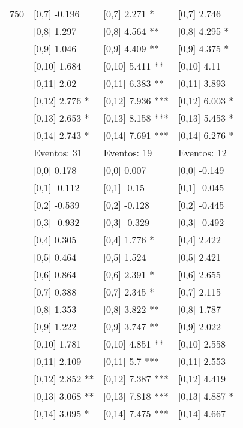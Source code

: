 \begin{table}
\begin{tabular}[t]{llll}
750 & {}[0,7] -0.196 & {}[0,7] 2.271 * & {}[0,7] 2.746\\
\addlinespace
 & {}[0,8] 1.297 & {}[0,8] 4.564 ** & {}[0,8] 4.295 *\\
 & {}[0,9] 1.046 & {}[0,9] 4.409 ** & {}[0,9] 4.375 *\\
 & {}[0,10] 1.684 & {}[0,10] 5.411 ** & {}[0,10] 4.11\\
 & {}[0,11] 2.02 & {}[0,11] 6.383 ** & {}[0,11] 3.893\\
 & {}[0,12] 2.776 * & {}[0,12] 7.936 *** & {}[0,12] 6.003 *\\
\addlinespace
 & {}[0,13] 2.653 * & {}[0,13] 8.158 *** & {}[0,13] 5.453 *\\
 & {}[0,14] 2.743 * & {}[0,14] 7.691 *** & {}[0,14] 6.276 *\\
 & Eventos:  31 & Eventos:  19 & Eventos:  12\\
 & {}[0,0] 0.178 & {}[0,0] 0.007 & {}[0,0] -0.149\\
 & {}[0,1] -0.112 & {}[0,1] -0.15 & {}[0,1] -0.045\\
\addlinespace
 & {}[0,2] -0.539 & {}[0,2] -0.128 & {}[0,2] -0.445\\
 & {}[0,3] -0.932 & {}[0,3] -0.329 & {}[0,3] -0.492\\
 & {}[0,4] 0.305 & {}[0,4] 1.776 * & {}[0,4] 2.422\\
 & {}[0,5] 0.464 & {}[0,5] 1.524 & {}[0,5] 2.421\\
 & {}[0,6] 0.864 & {}[0,6] 2.391 * & {}[0,6] 2.655\\
\addlinespace
1000 & {}[0,7] 0.388 & {}[0,7] 2.345 * & {}[0,7] 2.115\\
 & {}[0,8] 1.353 & {}[0,8] 3.822 ** & {}[0,8] 1.787\\
 & {}[0,9] 1.222 & {}[0,9] 3.747 ** & {}[0,9] 2.022\\
 & {}[0,10] 1.781 & {}[0,10] 4.851 ** & {}[0,10] 2.558\\
 & {}[0,11] 2.109 & {}[0,11] 5.7 *** & {}[0,11] 2.553\\
\addlinespace
 & {}[0,12] 2.852 ** & {}[0,12] 7.387 *** & {}[0,12] 4.419\\
 & {}[0,13] 3.068 ** & {}[0,13] 7.818 *** & {}[0,13] 4.887 *\\
 & {}[0,14] 3.095 * & {}[0,14] 7.475 *** & {}[0,14] 4.667\\
\bottomrule
\end{tabular}
\end{table}
